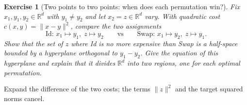 \documentclass[11pt,a4paper]{article}
\theoremstyle{exostyle}
\newtheorem{exercise}{Exercise}
\newcommand{\R}{\mathbb{R}}
\begin{document}
\begin{exercise}[Two points to two points: when does each permutation win?]\label{ex:two-points}
Fix $x_1,y_1,y_2\in\R^d$ with $y_1\ne y_2$ and let $x_2=z\in\R^d$ vary. With quadratic cost $c(x,y)=\|x-y\|^2$, compare the two assignments
\[
\text{Id: } x_1\mapsto y_1,\; z\mapsto y_2
\qquad\text{vs}\qquad
\text{Swap: } x_1\mapsto y_2,\; z\mapsto y_1.
\]
Show that the set of $z$ where \textnormal{Id} is no more expensive than \textnormal{Swap} is a half-space bounded by a hyperplane orthogonal to $y_1-y_2$. Give the equation of this hyperplane and explain that it divides $\R^d$ into two regions, one for each optimal permutation.
\begin{center}
\end{center}
\end{exercise}
\begin{hints}
Expand the difference of the two costs; the terms $\|z\|^2$ and the target squared norms cancel.
\end{hints}
\end{document}

